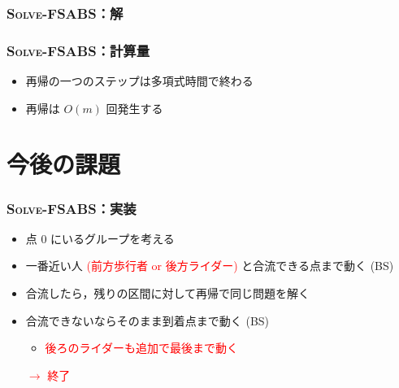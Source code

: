 \documentclass[dvipdfmx,12pt]{beamer}
\begin{document}
\begin{frame}
  \frametitle{\textsc{Solve-FSABS}：解}
\end{frame}

\begin{frame}
  \frametitle{\textsc{Solve-FSABS}：計算量}
  \begin{itemize}
  \item<2-> 再帰の一つのステップは多項式時間で終わる
  \item<3-> 再帰は $O(m)$ 回発生する
  \end{itemize}

\end{frame}

\section{今後の課題}

\begin{frame}
  \frametitle{\textsc{Solve-FSABS}：実装}
  \begin{itemize}
  \item 点 0 にいるグループを考える
  \item 一番近い人 \textcolor{red}{(前方歩行者 or 後方ライダー)} と合流できる点まで動く (BS)
  \item 合流したら，残りの区間に対して再帰で同じ問題を解く
  \item 合流できないならそのまま到着点まで動く (BS)
    \begin{itemize}
    \item \textcolor{red}{後ろのライダーも追加で最後まで動く}
    \end{itemize}

    \textcolor{red}{$\rightarrow$ 終了}
  \end{itemize}
\end{frame}
\end{document}
